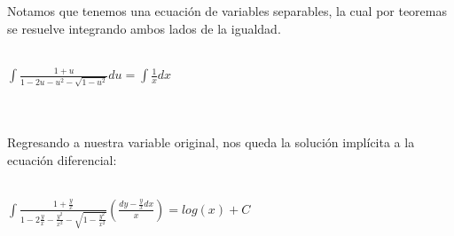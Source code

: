 \documentclass[a4paper,10pt]{article}
\begin{document}
Notamos que tenemos una ecuación de variables separables, la cual por teoremas se resuelve integrando ambos lados de la igualdad.\\\\
\centerline{$\int \frac{1+u}{1-2u-u^2- \sqrt{1-u^2}} du= \int \frac{1}{x}dx$ }\\\\
Regresando a nuestra variable original, nos queda la solución implícita a la ecuación diferencial:\\\\
\centerline{$\int \frac{1+\frac{y}{x}}{1-2\frac{y}{x} - \frac{y^2}{x^2} - \sqrt{1-\frac{y^2}{x^2}}} (\frac{dy-\frac{y}{x}dx}{x})= log(x) + C$}
\end{document}
